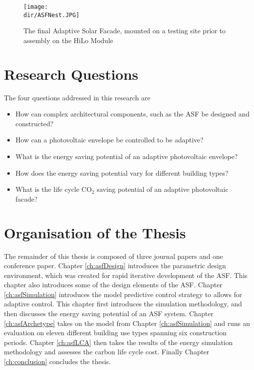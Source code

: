 \begin{figure}
\begin{center}
\texttt{[image: \\dir/ASFNest.JPG]}
\caption{The final Adaptive Solar Facade, mounted on a testing site prior to assembly on the HiLo Module}
\label{fig:ASFNest}
\end{center}
\end{figure}




\section{Research Questions}

The four questions addressed in this research are 

\begin{itemize}
\item How can complex architectural components, such as the ASF be designed and constructed? 
\item How can a photovoltaic envelope be controlled to be adaptive?
\item What is the energy saving potential of an adaptive photovoltaic envelope?
\item How does the energy saving potential vary for different building types?
\item What is the life cycle CO$_2$ saving potential of an adaptive photovoltaic facade?

\end{itemize}

\section{Organisation of the Thesis}

The remainder of this thesis is composed of three journal papers and one conference paper. Chapter \ref{ch:asfDesign} introduces the parametric design environment, which was created for rapid iterative development of the ASF. This chapter also introduces some of the design elements of the ASF. Chapter \ref{ch:asfSimulation} introduces the model predictive control strategy to allows for adaptive control. This chapter first introduces the simulation methodology, and then discusses the energy saving potential of an ASF system. Chapter \ref{ch:asfArchetype} takes on the model from Chapter \ref{ch:asfSimulation} and runs an evaluation on eleven different building use types spanning six construction periods. Chapter \ref{ch:asfLCA} then takes the results of the energy simulation methodology and assesses the carbon life cycle cost. Finally Chapter \ref{ch:conclusion} concludes the thesis. 